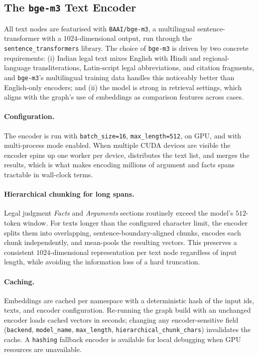 \subsection{The \texttt{bge-m3} Text Encoder}

All text nodes are featurised with \texttt{BAAI/bge-m3}, a multilingual
sentence-transformer with a $1024$-dimensional output, run through the
\texttt{sentence\_transformers} library. The choice of \texttt{bge-m3}
is driven by two concrete requirements: (i) Indian legal text mixes
English with Hindi and regional-language transliterations, Latin-script
legal abbreviations, and citation fragments, and \texttt{bge-m3}'s
multilingual training data handles this noticeably better than
English-only encoders; and (ii) the model is strong in retrieval
settings, which aligns with the graph's use of embeddings as
comparison features across cases.

\paragraph{Configuration.} The encoder is run with
\texttt{batch\_size=16}, \texttt{max\_length=512}, on GPU, and with
multi-process mode enabled. When multiple CUDA devices are visible the
encoder spins up one worker per device, distributes the text list, and
merges the results, which is what makes encoding millions of argument
and facts spans tractable in wall-clock terms.

\paragraph{Hierarchical chunking for long spans.} Legal judgment
\emph{Facts} and \emph{Arguments} sections routinely exceed the
model's $512$-token window. For texts longer than the configured
character limit, the encoder splits them into overlapping,
sentence-boundary-aligned chunks, encodes each chunk independently,
and mean-pools the resulting vectors. This preserves a consistent
$1024$-dimensional representation per text node regardless of input
length, while avoiding the information loss of a hard truncation.

\paragraph{Caching.} Embeddings are cached per namespace with a
deterministic hash of the input ids, texts, and encoder configuration.
Re-running the graph build with an unchanged encoder loads cached
vectors in seconds; changing any encoder-sensitive field
(\texttt{backend}, \texttt{model\_name}, \texttt{max\_length},
\texttt{hierarchical\_chunk\_chars}) invalidates the cache. A
\texttt{hashing} fallback encoder is available for local debugging
when GPU resources are unavailable.

